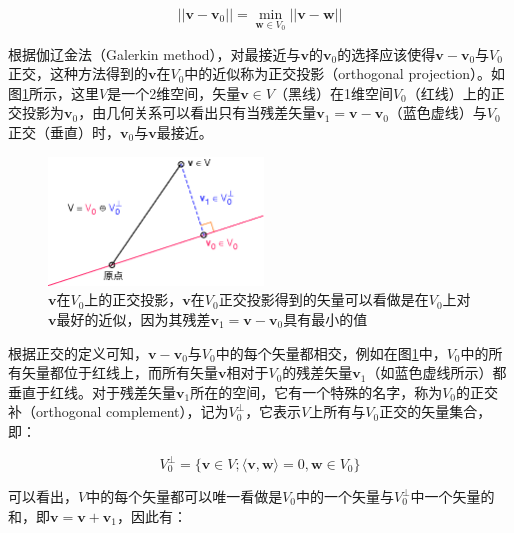 \begin{equation}
	||\mathbf{v}-\mathbf{v}_0||=\min_{\mathbf{w}\in V_0}||\mathbf{v}-\mathbf{w}||
\end{equation}

根据伽辽金法（Galerkin method）\cite{a:FiniteElementMethodsforGlobalIllumination,a:GalerkinaRadiosity:AHigherOrderSolutionMethodforGlobalIllumination}，对最接近与$\mathbf{v}$的$\mathbf{v}_0$的选择应该使得$\mathbf{v}-\mathbf{v}_0$与$V_0$正交，这种方法得到的$\mathbf{v}$在$V_0$中的近似称为正交投影（orthogonal projection）。如图\ref{f:r-projection}所示，这里$V$是一个2维空间，矢量$\mathbf{v}\in V$（黑线）在1维空间$V_0$（红线）上的正交投影为$\mathbf{v}_0$，由几何关系可以看出只有当残差矢量$\mathbf{v}_1=\mathbf{v}-\mathbf{v}_0$（蓝色虚线）与$V_0$正交（垂直）时，$\mathbf{v}_0$与$\mathbf{v}$最接近。

\begin{figure}
	\sidecaption
	\includegraphics[width=0.51\textwidth]{figures/r/projection}
	\caption{$\mathbf{v}$在$V_0$上的正交投影，$\mathbf{v}$在$V_0$正交投影得到的矢量可以看做是在$V_0$上对$\mathbf{v}$最好的近似，因为其残差$\mathbf{v}_1=\mathbf{v}-\mathbf{v}_0$具有最小的值}
	\label{f:r-projection}
\end{figure}

根据正交的定义可知，$\mathbf{v}-\mathbf{v}_0$与$V_0$中的每个矢量都相交，例如在图\ref{f:r-projection}中，$V_0$中的所有矢量都位于红线上，而所有矢量$\mathbf{v}$相对于$V_0$的残差矢量$\mathbf{v}_1$（如蓝色虚线所示）都垂直于红线。对于残差矢量$\mathbf{v}_1$所在的空间，它有一个特殊的名字，称为$V_0$的正交补（orthogonal complement），记为$V^{\perp}_0$，它表示$V$上所有与$V_0$正交的矢量集合，即：

\begin{equation}\label{e:r-orthogonal-complement-1}
	V^{\perp}_0=\{\mathbf{v}\in V;\langle\mathbf{v},\mathbf{w}\rangle=0,\mathbf{w}\in V_0\}	
\end{equation}

\noindent 可以看出，$V$中的每个矢量都可以唯一看做是$V_0$中的一个矢量与$V^{\perp}_0$中一个矢量的和，即$\mathbf{v}=\mathbf{v}+\mathbf{v}_1$，因此有：

